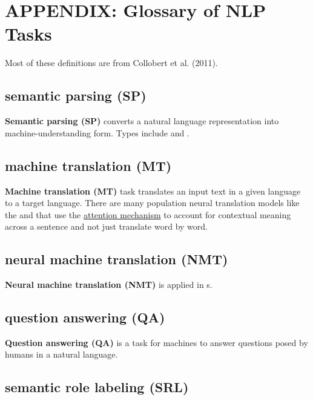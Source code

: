 \section{APPENDIX: Glossary of NLP Tasks} \label{app:Appendix_NLPTasks}

Most of these definitions are from Collobert et al. (2011). 


\subsection{semantic parsing (SP)} \label{nlptask:semanticparsingSP}

\textbf{Semantic parsing (SP)} converts a natural language representation into machine-understanding form. Types include  and .

\subsection{machine translation (MT)} \label{nlptask:machinetranslationMT}

\textbf{Machine translation (MT)} task translates an input text in a given language to a target language. There are many population neural translation models like the  and  that use the \hyperref[sec:AttentionMechanism]{attention mechanism} to account for contextual meaning across a sentence and not just translate word by word. 

\subsection{neural machine translation (NMT)} \label{nlptask:neuralmachinetranslationNMT}

\textbf{Neural machine translation (NMT)} is  applied in s. 


\subsection{question answering (QA)} \label{nlptask:questionansweringQA}

\textbf{Question answering (QA)} is a task for machines to answer questions posed by humans in a natural language. 


\subsection{semantic role labeling (SRL)} \label{nlptask:semanticrolelabelingSRL}

